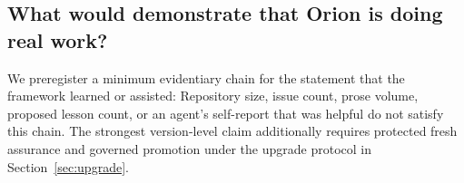 \subsection{What would demonstrate that Orion is doing real work?}

We preregister a minimum evidentiary chain for the statement that the framework learned or assisted:
Repository size, issue count, prose volume, proposed lesson count, or an agent's self-report that \RAKL{} was helpful do not satisfy this chain. The strongest version-level claim additionally requires protected fresh assurance and governed promotion under the upgrade protocol in Section~\ref{sec:upgrade}.